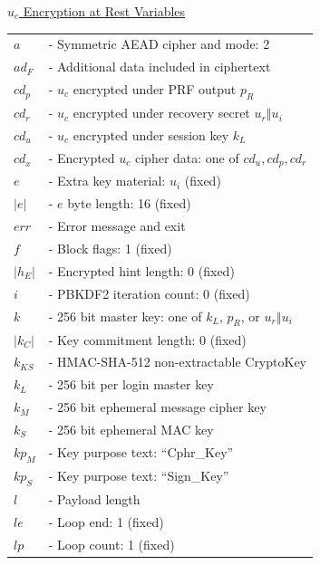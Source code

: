 \documentclass{article}
\newlength{\stanzagap}
\newlength{\stanzawidth}
\newlength{\stanzabox}
\newenvironment{stanza}[1][\stanzawidth]
  {\par\addvspace{\stanzagap}%
   \setlength{\stanzabox}{\dimexpr\linewidth-\parindent\relax}%
   \ifdim\stanzabox>#1\setlength{\stanzabox}{#1}\fi
   \noindent\hspace*{\parindent}\begin{minipage}{\stanzabox}}
  {\end{minipage}\par\addvspace{\stanzagap}}
\begin{document}
\begin{stanza}
\underline{$u_c$ Encryption at Rest Variables}\\

\begin{tabular}{@{}p{5mm} l}
$a$ & \textrm{ - Symmetric AEAD cipher and mode: 2}\\
$\mathit{ad}_F$ & \textrm{ - Additional data included in ciphertext}\\
$\mathit{cd}_p$ & \textrm{ - }$u_c$\textrm{ encrypted under PRF output }$p_R$\\
$\mathit{cd}_r$ & \textrm{ - }$u_c$\textrm{ encrypted under recovery secret }$u_r \mathbin\Vert u_i$\\
$\mathit{cd}_u$ & \textrm{ - }$u_c$\textrm{ encrypted under session key }$k_L$\\
$\mathit{cd}_x$ & \textrm{ - Encrypted }$u_c$\textrm{ cipher data: one of }$\mathit{cd}_u, \mathit{cd}_p, \mathit{cd}_r$\\
$e$ & \textrm{ - Extra key material: }$u_i$\textrm{ (fixed)}\\
$|e|$ & \textrm{ - }$e$\textrm{ byte length: 16 (fixed)}\\
$\mathit{err}$ & \textrm{ - Error message and exit}\\
$f$ & \textrm{ - Block flags: 1 (fixed)}\\
$|h_E|$ & \textrm{ - Encrypted hint length: 0 (fixed)}\\
$i$ & \textrm{ - PBKDF2 iteration count: 0 (fixed)}\\
$k$ & \textrm{ - 256 bit master key: one of }$k_L$\textrm{, }$p_R$\textrm{, or }$u_r \mathbin\Vert u_i$\\
$|k_C|$ & \textrm{ - Key commitment length: 0 (fixed)}\\
$k_{\mathit{KS}}$ & \textrm{ - HMAC-SHA-512 non-extractable CryptoKey}\\
$k_L$ & \textrm{ - 256 bit per login master key}\\
$k_M$ & \textrm{ - 256 bit ephemeral message cipher key}\\
$k_S$ & \textrm{ - 256 bit ephemeral MAC key}\\
$\mathit{kp}_M$ & \textrm{ - Key purpose text: ``Cphr\_Key''}\\
$\mathit{kp}_S$ & \textrm{ - Key purpose text: ``Sign\_Key''}\\
$l$ & \textrm{ - Payload length}\\
$\mathit{le}$ & \textrm{ - Loop end: 1 (fixed)}\\
$\mathit{lp}$ & \textrm{ - Loop count: 1 (fixed)}\\

\end{tabular}
\end{stanza}
\end{document}
